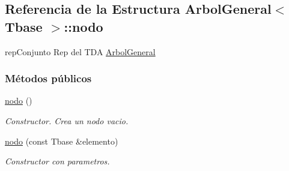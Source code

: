 \hypertarget{structArbolGeneral_1_1nodo}{}\subsection{Referencia de la Estructura Arbol\+General$<$ Tbase $>$\+:\+:nodo}
\label{structArbolGeneral_1_1nodo}


rep\+Conjunto Rep del T\+DA \hyperlink{classArbolGeneral}{Arbol\+General}  


\subsubsection*{Métodos públicos}
\begin{DoxyCompactItemize}
\item 
\hyperlink{structArbolGeneral_1_1nodo_aa217b530d586a4f7908df98083c697ff}{nodo} ()
\begin{DoxyCompactList}\small\item\em Constructor. Crea un nodo vacio. \end{DoxyCompactList}\item 
\hyperlink{structArbolGeneral_1_1nodo_a858436a6f4cf67e88dcea51708871de9}{nodo} (const Tbase \&elemento)
\begin{DoxyCompactList}\small\item\em Constructor con parametros. \end{DoxyCompactList}\end{DoxyCompactItemize}
